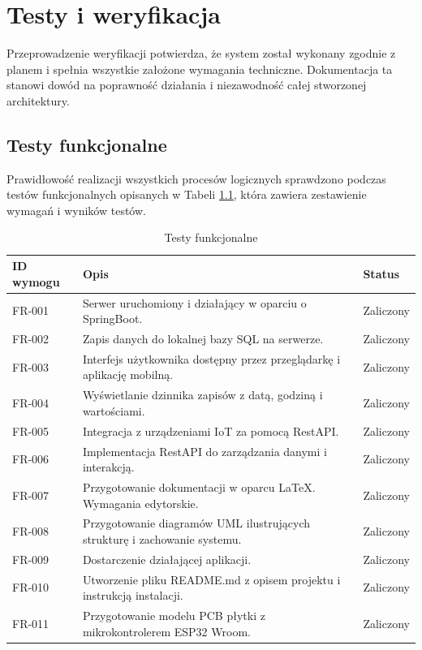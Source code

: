 \chapter{Testy i weryfikacja}
Przeprowadzenie weryfikacji potwierdza, że system został wykonany zgodnie z planem i spełnia wszystkie założone wymagania techniczne. Dokumentacja ta stanowi dowód na poprawność działania i niezawodność całej stworzonej architektury.

\section{Testy funkcjonalne}
Prawidłowość realizacji wszystkich procesów logicznych sprawdzono podczas testów funkcjonalnych opisanych w Tabeli \ref{tab:testyfunkcjonalne}, która zawiera zestawienie wymagań i wyników testów.

\begin{table}[ht!]
\centering
\caption{Testy funkcjonalne}
\label{tab:testyfunkcjonalne}
\begin{tabular}{lll}
\toprule
ID wymogu & Opis & Status \\  
\midrule
FR-001      & Serwer uruchomiony i działający w oparciu o SpringBoot.    & Zaliczony \\
FR-002      & Zapis danych do lokalnej bazy SQL na serwerze.    & Zaliczony \\ 
FR-003      & Interfejs użytkownika dostępny przez przeglądarkę i aplikację mobilną.    & Zaliczony \\
FR-004      & Wyświetlanie dzinnika zapisów z datą, godziną i wartościami.    & Zaliczony \\
FR-005      & Integracja z urządzeniami IoT za pomocą RestAPI.    & Zaliczony \\
FR-006      & Implementacja RestAPI do zarządzania danymi i interakcją.    & Zaliczony \\
FR-007      & Przygotowanie dokumentacji w oparcu LaTeX. Wymagania edytorskie.    & Zaliczony \\
FR-008      & Przygotowanie diagramów UML ilustrujących strukturę i zachowanie systemu.    & Zaliczony \\
FR-009      & Dostarczenie działającej aplikacji.    & Zaliczony \\
FR-010      & Utworzenie pliku README.md z opisem projektu i instrukcją instalacji.    & Zaliczony \\
FR-011      & Przygotowanie modelu PCB płytki z mikrokontrolerem ESP32 Wroom.    & Zaliczony \\
\bottomrule 
\end{tabular}
\end{table}

